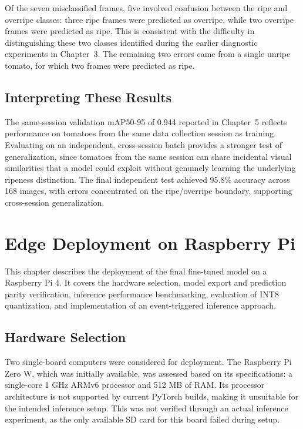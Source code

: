\documentclass[12pt,a4paper]{report}
\begin{document}
Of the seven misclassified frames, five involved confusion between the ripe and overripe classes: three ripe frames were predicted as overripe, while two overripe frames were predicted as ripe. This is consistent with the difficulty in distinguishing these two classes identified during the earlier diagnostic experiments in Chapter~3. The remaining two errors came from a single unripe tomato, for which two frames were predicted as ripe.

\section{Interpreting These Results}

The same-session validation mAP50-95 of 0.944 reported in Chapter~5 reflects performance on tomatoes from the same data collection session as training. Evaluating on an independent, cross-session batch provides a stronger test of generalization, since tomatoes from the same session can share incidental visual similarities that a model could exploit without genuinely learning the underlying ripeness distinction. The final independent test achieved 95.8\% accuracy across 168 images, with errors concentrated on the ripe/overripe boundary, supporting cross-session generalization.

\chapter{Edge Deployment on Raspberry Pi}

This chapter describes the deployment of the final fine-tuned model on a Raspberry Pi 4. It covers the hardware selection, model export and prediction parity verification, inference performance benchmarking, evaluation of INT8 quantization, and implementation of an event-triggered inference approach.

\section{Hardware Selection}

Two single-board computers were considered for deployment. The Raspberry Pi Zero W, which was initially available, was assessed based on its specifications: a single-core 1 GHz ARMv6 processor and 512 MB of RAM. Its processor architecture is not supported by current PyTorch builds, making it unsuitable for the intended inference setup. This was not verified through an actual inference experiment, as the only available SD card for this board failed during setup.
\end{document}
